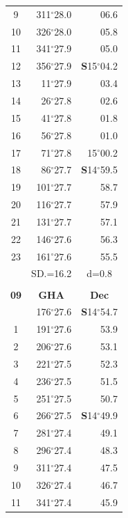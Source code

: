 \documentclass[10pt, a4paper]{report}
\begin{document}
\begin{scriptsize}
\begin{tabular*}{0.2\textwidth}[t]{@{\extracolsep{\fill}}|c|rr|}
9 & 311$^\circ$28.0 & \raisebox{0.24ex}{\boldmath$\cdot$~\boldmath$\cdot$~~}06.6\\
10 & 326$^\circ$28.0 & 05.8\\
11 & 341$^\circ$27.9 & 05.0\\[2Pt]
12 & 356$^\circ$27.9 & \textbf{S}15$^\circ$04.2\\
13 & 11$^\circ$27.9 & 03.4\\
14 & 26$^\circ$27.8 & 02.6\\
15 & 41$^\circ$27.8 & \raisebox{0.24ex}{\boldmath$\cdot$~\boldmath$\cdot$~~}01.8\\
16 & 56$^\circ$27.8 & 01.0\\
17 & 71$^\circ$27.8 & 15$^\circ$00.2\\[2Pt]
18 & 86$^\circ$27.7 & \textbf{S}14$^\circ$59.5\\
19 & 101$^\circ$27.7 & 58.7\\
20 & 116$^\circ$27.7 & 57.9\\
21 & 131$^\circ$27.7 & \raisebox{0.24ex}{\boldmath$\cdot$~\boldmath$\cdot$~~}57.1\\
22 & 146$^\circ$27.6 & 56.3\\
23 & 161$^\circ$27.6 & 55.5\\
\hline
\rule{0pt}{2.4ex} & \multicolumn{1}{c}{SD.=16.2} & \multicolumn{1}{c|}{d=0.8}\\
\hline
\multicolumn{1}{c}{}\\[-0.5ex]\hline
\multicolumn{1}{|c|}{\rule{0pt}{2.6ex}\textbf{09}} & \multicolumn{1}{c}{\textbf{GHA}} & \multicolumn{1}{c|}{\textbf{Dec}}\\
\hline\rule{0pt}{2.6ex}\noindent
0 & 176$^\circ$27.6 & \textbf{S}14$^\circ$54.7\\
1 & 191$^\circ$27.6 & 53.9\\
2 & 206$^\circ$27.6 & 53.1\\
3 & 221$^\circ$27.5 & \raisebox{0.24ex}{\boldmath$\cdot$~\boldmath$\cdot$~~}52.3\\
4 & 236$^\circ$27.5 & 51.5\\
5 & 251$^\circ$27.5 & 50.7\\[2Pt]
6 & 266$^\circ$27.5 & \textbf{S}14$^\circ$49.9\\
7 & 281$^\circ$27.4 & 49.1\\
8 & 296$^\circ$27.4 & 48.3\\
9 & 311$^\circ$27.4 & \raisebox{0.24ex}{\boldmath$\cdot$~\boldmath$\cdot$~~}47.5\\
10 & 326$^\circ$27.4 & 46.7\\
11 & 341$^\circ$27.4 & 45.9\\[2Pt]

\end{tabular*}
\end{scriptsize}
\end{document}

